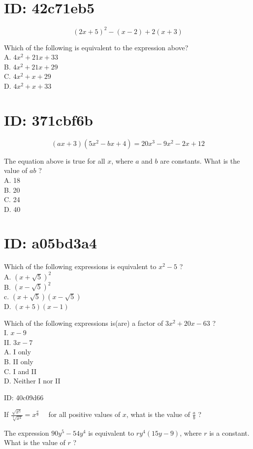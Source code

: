 \section*{ID: 42c71eb5}
$$
(2 x+5)^{2}-(x-2)+2(x+3)
$$

Which of the following is equivalent to the expression above?\\
A. $4 x^{2}+21 x+33$\\
B. $4 x^{2}+21 x+29$\\
C. $4 x^{2}+x+29$\\
D. $4 x^{2}+x+33$

\section*{ID: 371cbf6b}
$$
(a x+3)\left(5 x^{2}-b x+4\right)=20 x^{3}-9 x^{2}-2 x+12
$$

The equation above is true for all $x$, where $a$ and $b$ are constants. What is the value of $a b$ ?\\
A. 18\\
B. 20\\
C. 24\\
D. 40

\section*{ID: a05bd3a4}
Which of the following expressions is equivalent to $x^{2}-5$ ?\\
A. $(x+\sqrt{5})^{2}$\\
B. $(x-\sqrt{5})^{2}$\\
c. $(x+\sqrt{5})(x-\sqrt{5})$\\
D. $(x+5)(x-1)$

Which of the following expressions is(are) a factor of $3 x^{2}+20 x-63$ ?\\
I. $x-9$\\
II. $3 x-7$\\
A. I only\\
B. II only\\
C. I and II\\
D. Neither I nor II

ID: 40c09d66

If $\frac{\sqrt{x^{5}}}{\sqrt[3]{x^{4}}}=x^{\frac{a}{b}} \quad$ for all positive values of $x$, what is the value of $\frac{a}{b}$ ?

The expression $90 y^{5}-54 y^{4}$ is equivalent to $r y^{4}(15 y-9)$, where $r$ is a constant. What is the value of $r$ ?

